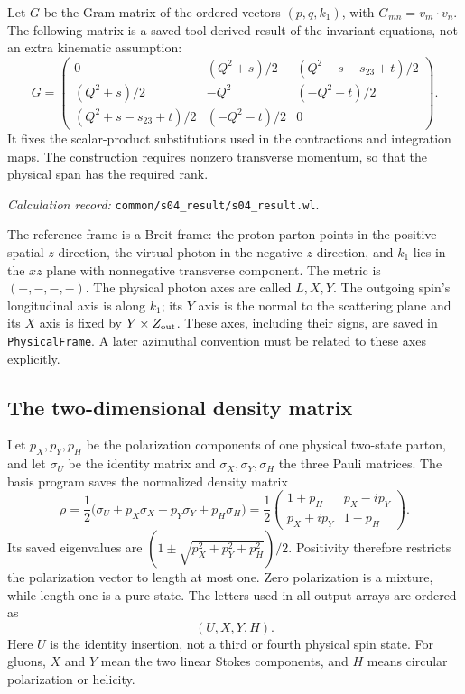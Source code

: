 \documentclass[11pt,a4paper]{article}
\newcommand{\code}[1]{{\small\nolinkurl{#1}}}
\newcommand{\pathref}[1]{\par{\footnotesize\textit{Calculation record:} \code{#1}.}\par}
\begin{document}
Let $G$ be the Gram matrix of the ordered vectors $(p,q,k_1)$, with $G_{mn}=v_m\cdot v_n$. The following matrix is a saved tool-derived result of the invariant equations, not an extra kinematic assumption:
\begin{equation}
G=\begin{pmatrix}
0&(Q^2+s)/2&(Q^2+s-s_{23}+t)/2\\
(Q^2+s)/2&-Q^2&(-Q^2-t)/2\\
(Q^2+s-s_{23}+t)/2&(-Q^2-t)/2&0
\end{pmatrix}.
\end{equation}
It fixes the scalar-product substitutions used in the contractions and integration maps. The construction requires nonzero transverse momentum, so that the physical span has the required rank.
\pathref{common/s04_result/s04_result.wl}

The reference frame is a Breit frame: the proton parton points in the positive spatial $z$ direction, the virtual photon in the negative $z$ direction, and $k_1$ lies in the $xz$ plane with nonnegative transverse component. The metric is $(+,-,-,-)$. The physical photon axes are called $L,X,Y$. The outgoing spin's longitudinal axis is along $k_1$; its $Y$ axis is the normal to the scattering plane and its $X$ axis is fixed by $Y\mathbin{\times}Z_{\rm out}$. These axes, including their signs, are saved in \code{PhysicalFrame}. A later azimuthal convention must be related to these axes explicitly.

\subsection{The two-dimensional density matrix}
Let $p_X,p_Y,p_H$ be the polarization components of one physical two-state parton, and let $\sigma_U$ be the identity matrix and $\sigma_X,\sigma_Y,\sigma_H$ the three Pauli matrices. The basis program saves the normalized density matrix
\begin{equation}
 \rho=\frac12\bigl(\sigma_U+p_X\sigma_X+p_Y\sigma_Y+p_H\sigma_H\bigr)
 =\frac12\begin{pmatrix}1+p_H&p_X-i p_Y\\p_X+i p_Y&1-p_H\end{pmatrix}.
\end{equation}
Its saved eigenvalues are $(1\pm\sqrt{p_X^2+p_Y^2+p_H^2})/2$. Positivity therefore restricts the polarization vector to length at most one. Zero polarization is a mixture, while length one is a pure state. The letters used in all output arrays are ordered as
\begin{equation}
 (U,X,Y,H).
\end{equation}
Here $U$ is the identity insertion, not a third or fourth physical spin state. For gluons, $X$ and $Y$ mean the two linear Stokes components, and $H$ means circular polarization or helicity.
\end{document}
